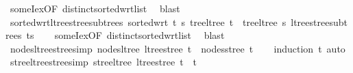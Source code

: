 \begin{isabellebody}
\endisadelimproof
%
\isatagproof
{}\isamarkupfalse%
\ someI{\isacharunderscore}{\kern0pt}ex{\isacharbrackleft}{\kern0pt}OF\ distinct{\isacharunderscore}{\kern0pt}sorted{\isacharunderscore}{\kern0pt}wrt{\isacharunderscore}{\kern0pt}list{\isacharbrackright}{\kern0pt}\ \isamarkupfalse%
\ blast%
\endisatagproof
{\isafoldproof}%
%
\isadelimproof
\isanewline
%
\endisadelimproof
\isanewline
{}\isamarkupfalse%
\ sorted{\isacharunderscore}{\kern0pt}wrt{\isacharunderscore}{\kern0pt}ltree{\isacharunderscore}{\kern0pt}stree{\isacharunderscore}{\kern0pt}subtrees{\isacharcolon}{\kern0pt}\ {\isachardoublequoteopen}sorted{\isacharunderscore}{\kern0pt}wrt\ {\isacharparenleft}{\kern0pt}{\isasymlambda}t\ s{\isachardot}{\kern0pt}\ tree{\isacharunderscore}{\kern0pt}ltree\ t\ {\isasymle}\ tree{\isacharunderscore}{\kern0pt}ltree\ s{\isacharparenright}{\kern0pt}\ {\isacharparenleft}{\kern0pt}ltree{\isacharunderscore}{\kern0pt}stree{\isacharunderscore}{\kern0pt}subtrees\ ts{\isacharparenright}{\kern0pt}{\isachardoublequoteclose}\isanewline
%
\isadelimproof
\ \ %
\endisadelimproof
%
\isatagproof
{}\isamarkupfalse%
\ someI{\isacharunderscore}{\kern0pt}ex{\isacharbrackleft}{\kern0pt}OF\ distinct{\isacharunderscore}{\kern0pt}sorted{\isacharunderscore}{\kern0pt}wrt{\isacharunderscore}{\kern0pt}list{\isacharbrackright}{\kern0pt}\ \isamarkupfalse%
\ blast%
\endisatagproof
{\isafoldproof}%
%
\isadelimproof
\isanewline
%
\endisadelimproof
\isanewline
{}\isamarkupfalse%
\ nodes{\isacharunderscore}{\kern0pt}ltree{\isacharunderscore}{\kern0pt}stree{\isacharbrackleft}{\kern0pt}simp{\isacharbrackright}{\kern0pt}{\isacharcolon}{\kern0pt}\ {\isachardoublequoteopen}nodes{\isacharunderscore}{\kern0pt}ltree\ {\isacharparenleft}{\kern0pt}ltree{\isacharunderscore}{\kern0pt}stree\ t{\isacharparenright}{\kern0pt}\ {\isacharequal}{\kern0pt}\ nodes{\isacharunderscore}{\kern0pt}stree\ t{\isachardoublequoteclose}\isanewline
%
\isadelimproof
\ \ %
\endisadelimproof
%
\isatagproof
{}\isamarkupfalse%
\ {\isacharparenleft}{\kern0pt}induction\ t{\isacharparenright}{\kern0pt}\ auto%
\endisatagproof
{\isafoldproof}%
%
\isadelimproof
\isanewline
%
\endisadelimproof
\isanewline
{}\isamarkupfalse%
\ stree{\isacharunderscore}{\kern0pt}ltree{\isacharunderscore}{\kern0pt}stree{\isacharbrackleft}{\kern0pt}simp{\isacharbrackright}{\kern0pt}{\isacharcolon}{\kern0pt}\ {\isachardoublequoteopen}stree{\isacharunderscore}{\kern0pt}ltree\ {\isacharparenleft}{\kern0pt}ltree{\isacharunderscore}{\kern0pt}stree\ t{\isacharparenright}{\kern0pt}\ {\isacharequal}{\kern0pt}\ t{\isachardoublequoteclose}\isanewline

\end{isabellebody}

